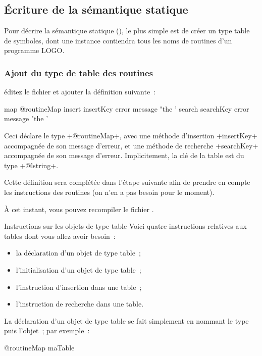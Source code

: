 \subsection{Écriture de la sémantique statique}
Pour décrire la sémantique statique (), le plus simple est de créer un type table de symboles, dont une instance contiendra tous les noms de routines d'un programme LOGO.

\subsubsection{Ajout du type de table des routines}
éditez le fichier  et ajouter la définition suivante~:

\begin{galgas}
map @routineMap {
  insert insertKey error message "the '%
  search searchKey error message "the '%
}
\end{galgas}

Ceci déclare le type \ggs+@routineMap+, avec une méthode d'insertion \ggs+insertKey+ accompagnée de son message d'erreur, et une méthode de recherche \ggs+searchKey+ accompagnée de son message d'erreur. Implicitement, la clé de la table est du type \ggs+@lstring+.

Cette définition sera complétée dans l'étape suivante afin de prendre en compte les instructions des routines (on n'en a pas besoin pour le moment).

À cet instant, vous pouvez recompiler le fichier .

Instructions sur les objets de type table
Voici quatre instructions relatives aux tables dont vous allez avoir besoin~:
\begin{itemize}
  \item la déclaration d'un objet de type table~;
  \item l'initialisation d'un objet de type table~;
  \item l'instruction d'insertion dans une table~;
  \item l'instruction de recherche dans une table.
\end{itemize}

La déclaration d'un objet de type table se fait simplement en nommant le type puis l'objet~; par exemple~:
\begin{galgas}
@routineMap maTable
\end{galgas}

